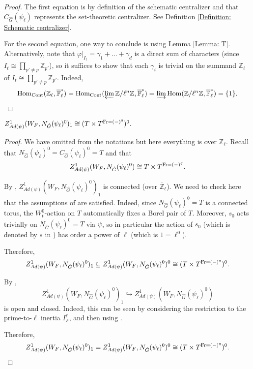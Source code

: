 \begin{proof}
	The first equation is by definition of the schematic centralizer and that $C_{\hat{G}}(\psi_{\ell})$ represents the set-theoretic centralizer. See Definition \ref{Definition: Schematic centralizer}.
	
	For the second equation, one way to conclude is using Lemma \ref{Lemma: T}. Alternatively, note that $\varphi|_{I_t}=\gamma_1 + ...+ \gamma_d$ is a direct sum of characters (since $I_t \cong \prod_{p'\neq p}\mathbb{Z}_{p'}$), so it suffices to show that each $\gamma_i$ is trivial on the summand $\mathbb{Z}_{\ell}$ of $I_t\cong \prod_{p'\neq p}\mathbb{Z}_{p'}$.
	Indeed,
	$$\operatorname{\operatorname{Hom}}_{\operatorname{Cont}}(\mathbb{Z}_{\ell}, \overline{\mathbb{F}}_{\ell}^*)=\operatorname{\operatorname{Hom}}_{\operatorname{Cont}}(\varprojlim\mathbb{Z}/\ell^n\mathbb{Z}, \overline{\mathbb{F}}_{\ell}^*)=\varinjlim\operatorname{\operatorname{Hom}}(\mathbb{Z}/\ell^n\mathbb{Z}, \overline{\mathbb{F}}_{\ell}^*)=\{1\}.$$
\end{proof}

\begin{lemma}\label{Lem_Z^1()_1}
	$Z^1_{Ad(\psi)}(W_F, N_{\hat{G}}(\psi_{\ell})^0)_1 \cong (T \times T^{\operatorname{Fr}=(-)^q})^0.$
\end{lemma}

\begin{proof}
	We have omitted from the notations but here everything is over $\overline{\mathbb{Z}}_{\ell}$.
	Recall that $N_{\hat{G}}(\psi_{\ell})^0=C_{\hat{G}}(\psi_{\ell})^0=T$ and that
	$$Z^1_{Ad(\psi)}(W_F, N_{\hat{G}}(\psi_{\ell})^0) \cong T \times T^{\operatorname{Fr}=(-)^q}.$$
	
	By \cite[Section 5.4, 5.5]{dat2022ihes}, $Z^1_{Ad(\psi)}(W_F, N_{\hat{G}}(\psi_{\ell})^0)_1$ is connected (over $\overline{\mathbb{Z}}_{\ell}$). We need to check here that the assumptions of \cite[Section 5.4, 5.5]{dat2022ihes} are satisfied. Indeed, since $N_{\hat{G}}(\psi_{\ell})^0=T$ is a connected torus, the $W_t^0$-action on $T$ automatically fixes a Borel pair of $T$. Moreover, $s_0$ acts trivially on $N_{\hat{G}}(\psi_{\ell})^0=T$ via $\psi$, so in particular the action of $s_0$ (which is denoted by $s$ in \cite[Section 5.5]{dat2022ihes}) has order a power of $\ell$ (which is $1 = \ell^0$).
	
	Therefore, 
	$$Z^1_{Ad(\psi)}(W_F, N_{\hat{G}}(\psi_{\ell})^0)_1 \subseteq Z^1_{Ad(\psi)}(W_F, N_{\hat{G}}(\psi_{\ell})^0)^0 \cong (T \times T^{\operatorname{Fr}=(-)^q})^0.$$
	
	By \cite[Section 4.6]{dat2022ihes}, 
	$$Z^1_{Ad(\psi)}(W_F, N_{\hat{G}}(\psi_{\ell})^0)_1 \hookrightarrow Z^1_{Ad(\psi)}(W_F, N_{\hat{G}}(\psi_{\ell})^0)$$
	is open and closed. Indeed, this can be seen by considering the restriction to the prime-to-$\ell$ inertia $I_F^{\ell}$, and then using \cite[Theorem 4.2]{dat2022ihes}.
	
	Therefore, 
	$$Z^1_{Ad(\psi)}(W_F, N_{\hat{G}}(\psi_{\ell})^0)_1 = Z^1_{Ad(\psi)}(W_F, N_{\hat{G}}(\psi_{\ell})^0)^0 \cong (T \times T^{\operatorname{Fr}=(-)^q})^0.$$
	
\end{proof}




